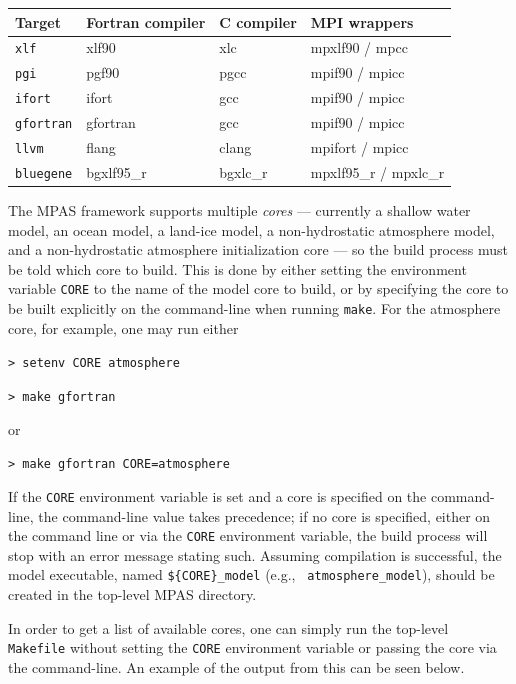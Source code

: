 \vspace{12pt}
\begin{longtable}{| l | l | l | l |}
\hline
Target & Fortran compiler & C compiler & MPI wrappers \\ \hline \hline
{\tt xlf} & xlf90 & xlc & mpxlf90 / mpcc \\ \hline
{\tt pgi} & pgf90 & pgcc & mpif90 / mpicc \\ \hline
{\tt ifort} & ifort & gcc & mpif90 / mpicc \\ \hline
{\tt gfortran} & gfortran & gcc & mpif90 / mpicc \\ \hline
{\tt llvm} & flang & clang & mpifort / mpicc \\ \hline
{\tt bluegene} & bgxlf95\_r & bgxlc\_r & mpxlf95\_r / mpxlc\_r \\ \hline
\end{longtable}
\vspace{12pt}

The MPAS framework supports multiple {\em cores} --- currently a shallow water
model, an ocean model, a land-ice model, a non-hydrostatic atmosphere model, and
a non-hydrostatic atmosphere initialization core --- so the build process must be told which core
to build. This is done by either setting the environment variable {\tt CORE} to
the name of the model core to build, or by specifying the core to be built
explicitly on the command-line when running {\tt make}. For the atmosphere
core, for example, one may run either

\vspace{12pt}
{\tt > setenv CORE atmosphere}

{\tt > make gfortran}
\vspace{12pt}

\noindent or

\vspace{12pt}
{\tt > make gfortran CORE=atmosphere}
\vspace{12pt}

If the {\tt CORE} environment variable is set and a core is specified on the
command-line, the command-line value takes precedence; if no core is specified,
either on the command line or via the {\tt CORE} environment variable, the build
process will stop with an error message stating such.  Assuming compilation is
successful, the model executable, named {\tt \$\{CORE\}\_model} (e.g., {\tt
atmosphere\_model}), should be created in the top-level MPAS directory.

In order to get a list of available cores, one can simply run the top-level {\tt
Makefile} without setting the {\tt CORE} environment variable or passing the
core via the command-line. An example of the output from this can be seen
below.

